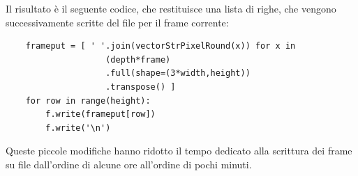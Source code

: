 \documentclass[11pt,a4paper]{article}
\begin{document}
Il risultato è il seguente codice, che restituisce una lista di righe, che vengono successivamente scritte del file per il frame corrente:
\begin{lstlisting}
    frameput = [ ' '.join(vectorStrPixelRound(x)) for x in 
                    (depth*frame)
                    .full(shape=(3*width,height))
                    .transpose() ]
    for row in range(height):
        f.write(frameput[row])
        f.write('\n')
\end{lstlisting}

Queste piccole modifiche hanno ridotto il tempo dedicato alla scrittura dei frame su file dall'ordine di alcune ore all'ordine di pochi minuti.



\end{document}
